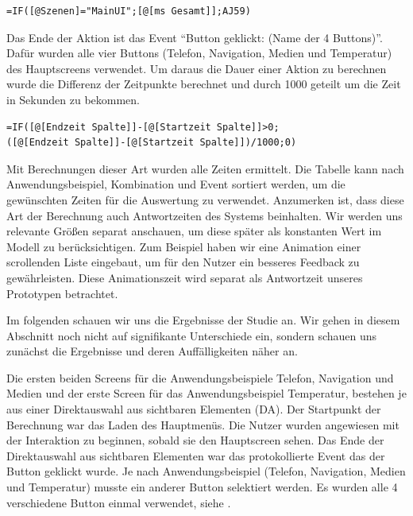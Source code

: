 \begin{lstlisting}
=IF([@Szenen]="MainUI";[@[ms Gesamt]];AJ59)
\end{lstlisting}

Das Ende der Aktion ist das Event "`Button geklickt: (Name der 4 Buttons)"'. 
Dafür wurden alle vier Buttons (Telefon, Navigation, Medien und Temperatur) des Hauptscreens verwendet. 
Um daraus die Dauer einer Aktion zu berechnen wurde die Differenz der Zeitpunkte berechnet und durch 1000 geteilt um die Zeit in Sekunden zu bekommen.

\begin{lstlisting}
=IF([@[Endzeit Spalte]]-[@[Startzeit Spalte]]>0;
([@[Endzeit Spalte]]-[@[Startzeit Spalte]])/1000;0)
\end{lstlisting}

Mit Berechnungen dieser Art wurden alle Zeiten ermittelt. Die Tabelle kann nach Anwendungsbeispiel, Kombination und Event sortiert werden, um die gewünschten Zeiten für die Auswertung zu verwendet. 
Anzumerken ist, dass diese Art der Berechnung auch Antwortzeiten des Systems beinhalten. 
Wir werden uns relevante Größen separat anschauen, um diese später als konstanten Wert im Modell zu berücksichtigen. 
Zum Beispiel haben wir eine Animation einer scrollenden Liste eingebaut, um für den Nutzer ein besseres Feedback zu gewährleisten. 
Diese Animationszeit wird separat als Antwortzeit unseres Prototypen betrachtet. 

Im folgenden schauen wir uns die Ergebnisse der Studie an. 
Wir gehen in diesem Abschnitt noch nicht auf signifikante Unterschiede ein, sondern schauen uns zunächst die Ergebnisse und deren Auffälligkeiten näher an. 

Die ersten beiden Screens für die Anwendungsbeispiele Telefon, Navigation und Medien und der erste Screen für das Anwendungsbeispiel Temperatur, bestehen je aus einer Direktauswahl aus sichtbaren Elementen (DA). 
Der Startpunkt der Berechnung war das Laden des Hauptmenüs. 
Die Nutzer wurden angewiesen mit der Interaktion zu beginnen, sobald sie den Hauptscreen sehen. 
Das Ende der Direktauswahl aus sichtbaren Elementen war das protokollierte Event das der Button geklickt wurde. 
Je nach Anwendungsbeispiel (Telefon, Navigation, Medien und Temperatur) musste ein anderer Button selektiert werden. 
Es wurden alle 4 verschiedene Button einmal verwendet, siehe .

